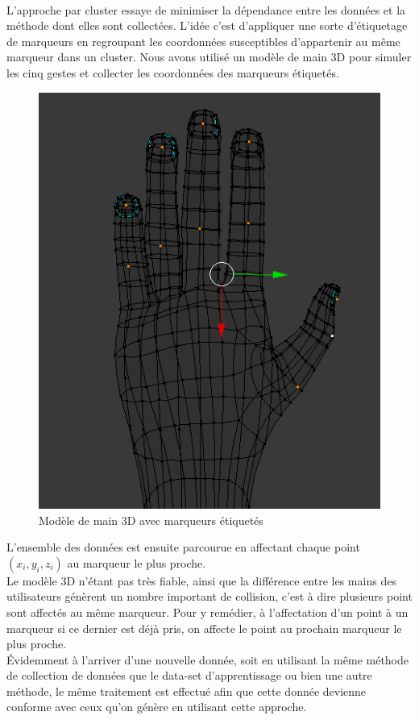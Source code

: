 \paragraph{}
L’approche par cluster essaye de minimiser la dépendance entre les données et la méthode dont elles sont collectées. L’idée c’est d’appliquer une sorte d’étiquetage de marqueurs en regroupant les coordonnées susceptibles d’appartenir au même marqueur dans un cluster. Nous avons utilisé un modèle de main 3D pour simuler les cinq gestes et collecter les coordonnées des marqueurs étiquetés.\\
\begin{center}
	\begin{figure}[H]
		\centering
		\includegraphics[scale=0.4]{images/3DModel.png}
		\caption{\small Modèle de main 3D avec marqueurs étiquetés}
	\end{figure}
\end{center}
L’ensemble des données est ensuite parcourue en affectant chaque point $(x_i,y_i,z_i)$ au marqueur le plus proche.\\
Le modèle 3D n’étant pas très fiable, ainsi que la différence entre les mains des utilisateurs génèrent un nombre important de collision, c’est à dire plusieurs point sont affectés au même marqueur. Pour y remédier, à l’affectation d’un point à un marqueur si ce dernier est déjà pris, on affecte le point au prochain marqueur le plus proche.\\
Évidemment à l’arriver d’une nouvelle donnée, soit en utilisant la même méthode de collection de données que le data-set d’apprentissage ou bien une autre méthode, le même traitement est effectué afin que cette donnée devienne conforme avec ceux qu’on génère en utilisant cette approche.
